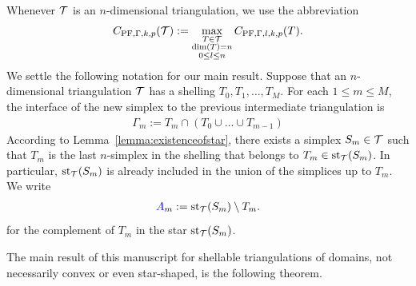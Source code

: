 \documentclass[10pt,letterpaper]{article}
\begin{document}
Whenever ${\mathcal T}$ is an $n$-dimensional triangulation, we use the abbreviation
\begin{align*}
    C_{{\rm PF},\Gamma,k,p}({\mathcal T}) 
    :=
    \max\limits_{ \substack{ T \in {\mathcal T} \\ \dim(T)=n \\ 0 \leq l \leq n } }
    C_{{\rm PF},\Gamma,l,k,p}(T)
    .
\end{align*}
We settle the following notation for our main result. 
Suppose that an $n$-dimensional triangulation ${\mathcal T}$ has a shelling $T_{0}, T_{1}, \dots, T_{M}$. 
For each $1 \leq m \leq M$, the interface of the new simplex to the previous intermediate triangulation is 
\begin{align*}
    \Gamma_{m} := T_{m} \cap \left( T_{0} \cup \dots \cup T_{m-1} \right)
\end{align*}
According to Lemma~\ref{lemma:existenceofstar}, 
there exists a simplex $S_{m} \in {\mathcal T}$ 
such that $T_{m}$ is the last $n$-simplex in the shelling that belongs to $T_{m} \in \operatorname{st}_{{\mathcal T}}(S_{m})$.
In particular, $\operatorname{st}_{{\mathcal T}}(S_{m})$ is already included in the union of the simplices up to $T_m$. 
We write 
\begin{align*}
    {\color{blue}A}_{m} := \operatorname{st}_{{\mathcal T}}(S_{m}) \setminus T_{m}.
\end{align*}
for the complement of $T_{m}$ in the star $\operatorname{st}_{{\mathcal T}}(S_{m})$. 

The main result of this manuscript for shellable triangulations of domains, not necessarily convex or even star-shaped, is the following theorem. 
\end{document}
